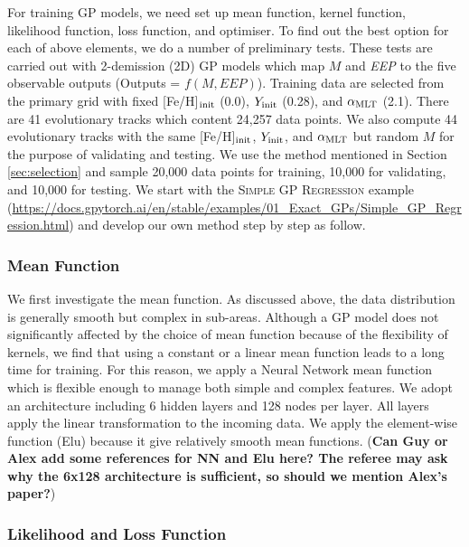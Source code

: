 For training GP models, we need set up mean function, kernel function, likelihood function, loss function, and optimiser. 
To find out the best option for each of above elements, we do a number of preliminary tests. 
These tests are carried out with 2-demission (2D) GP models which map $M$ and {\it EEP} to the five observable outputs (Outputs = $f(M, EEP)$). Training data are selected from the primary grid with fixed [Fe/H]$_{\rm init}$ (0.0), $Y_{\rm init}$ (0.28), and $\alpha_{\rm MLT}$ (2.1). There are 41 evolutionary tracks which content 24,257 data points. We also compute 44 evolutionary tracks with the same [Fe/H]$_{\rm init}$, $Y_{\rm init}$, and $\alpha_{\rm MLT}$ but random $M$ for the purpose of validating and testing. We use the method mentioned in Section \ref{sec:selection} and sample 20,000 data points for training, 10,000 for validating, and 10,000 for testing. 
%
We start with the \textsc{Simple GP Regression} example (\url{https://docs.gpytorch.ai/en/stable/examples/01_Exact_GPs/Simple_GP_Regression.html}) and develop our own method step by step as follow. 

\subsubsection{Mean Function}

We first investigate the mean function. As discussed above, the data distribution is generally smooth but complex in sub-areas. Although a GP model does not significantly affected by the choice of mean function because of the flexibility of kernels, we find that using a constant or a linear mean function leads to a long time for training. For this reason, we apply a Neural Network mean function which is flexible enough to manage both simple and complex features. We adopt an architecture including 6 hidden layers and 128 nodes per layer. All layers apply the linear transformation to the incoming data. We apply the element-wise function (Elu) because it give relatively smooth mean functions. ({\bf Can Guy or Alex add some references for NN and Elu here? The referee may ask why the 6x128 architecture is sufficient, so should we mention Alex's paper?})

\subsubsection{Likelihood and Loss Function}

